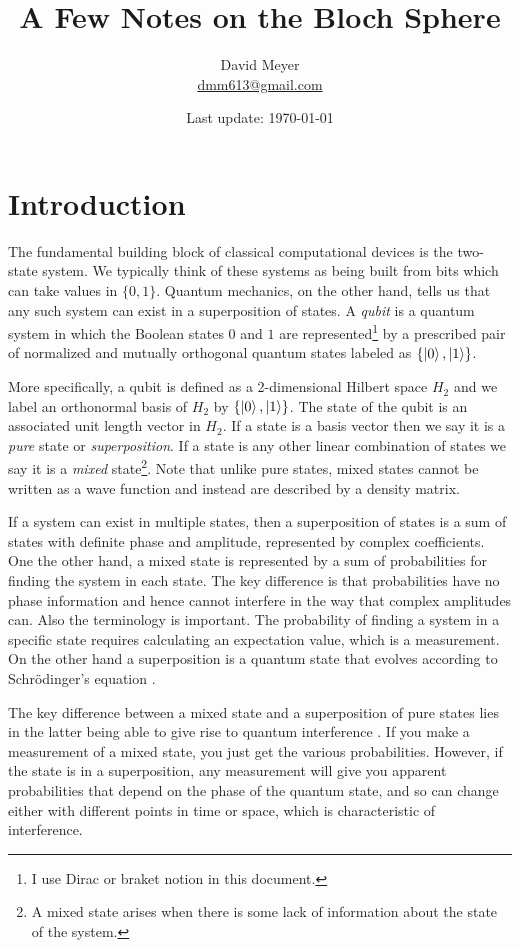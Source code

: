 \documentclass{article}
\title{A Few Notes on the Bloch Sphere}
\author{David Meyer \\ \href{mailto:dmm613@gmail.com}
                            {dmm613@gmail.com}}
\date{Last update: \today}
\theoremstyle{definition}
\begin{document}
\maketitle
%
%
%
\section{Introduction}
\label{sec:intro}
The fundamental building block of classical computational devices
is the two-state system. We typically think of these systems as
being built from bits which can take values in $\{0,1\}$.
Quantum mechanics, on the other hand, tells us that any such
system can exist in a superposition of states.  A \emph{qubit} is
a quantum system in which the Boolean states $0$ and $1$ are
represented\footnote{I use Dirac or braket notion \cite{wang2007}
in this document.}  by a prescribed pair of normalized and
mutually orthogonal quantum states labeled as
$\{\ket{0},\ket{1}\}$.
 
\bigskip
\noindent
More specifically, a qubit is defined as a 2-dimensional Hilbert
space $H_2$ and we label an orthonormal basis of $H_2$ by
$\{\ket{0}, \ket{1}\}$. The state of the qubit is an associated
unit length vector in $H_2$. If a state is a basis vector then 
we say it is a \emph{pure} state or \emph{superposition}. If a state 
is any other linear combination of states we say it is a \emph{mixed} 
state\footnote{A mixed state arises when there is some lack of information 
about the state of the system.}. Note that unlike pure states, mixed states 
cannot be written as a wave function and instead are described by a density 
matrix.



\bigskip
\noindent
If a system can exist in multiple states, then a superposition of 
states is a sum of states with definite phase and amplitude, represented 
by complex coefficients. One the other hand, a mixed state is represented by
a sum of probabilities for finding the system in each state. The
key difference is that probabilities have no phase information
and hence cannot interfere in the way that complex amplitudes
can. Also the terminology is important. The probability of
finding a system in a specific state requires calculating an
expectation value, which is a measurement. On the other hand a
superposition is a quantum state that evolves according to
Schr{\"o}dinger's equation \cite{wiki:schrodinger_equation}.

\bigskip
\noindent
The key difference between a mixed state and a superposition of
pure states lies in the latter being able to give rise to quantum
interference \cite{wiki:wave_interference}. If you make a measurement 
of a mixed state, you just get the various probabilities. However, 
if the state is in a superposition, any measurement will give you 
apparent probabilities that depend on the phase of the quantum state, 
and so can change either with different points in time or space,
which is characteristic of interference. 
\end{document}
